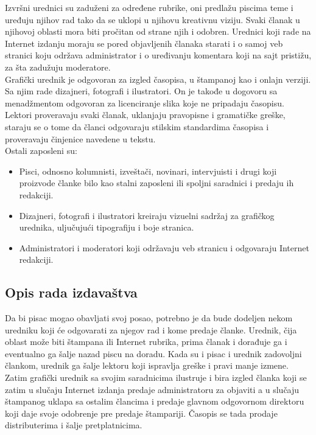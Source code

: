 \documentclass[a4paper,12pt]{extarticle}
\begin{document}
Izvršni urednici su zaduženi za određene rubrike, oni predlažu piscima teme i uređuju njihov  rad tako da se uklopi u njihovu kreativnu viziju. Svaki članak u  njihovoj oblasti mora biti pročitan od strane njih i odobren. Urednici koji rade na Internet izdanju moraju se pored objavljenih članaka starati i o samoj veb stranici koju održava administrator i o uređivanju komentara koji na sajt pristižu, za šta zadužuju moderatore. \\

Grafički urednik je odgovoran za izgled časopisa, u štampanoj kao i onlajn verziji. Sa njim rade dizajneri, fotografi i ilustratori. On je takođe u dogovoru sa menadžmentom odgovoran za licenciranje slika koje ne pripadaju časopisu. \\

Lektori proveravaju svaki članak, uklanjaju pravopisne i gramatičke greške, staraju se o tome da članci odgovaraju stilskim standardima časopisa i proveravaju činjenice navedene u tekstu. \\

Ostali zaposleni su:
\begin{itemize}
\item  Pisci, odnosno kolumnisti, izveštači, novinari, intervjuisti i drugi koji proizvode članke bilo kao stalni zaposleni ili spoljni saradnici i predaju ih redakciji.
\item  Dizajneri, fotografi i ilustratori kreiraju vizuelni sadržaj za grafičkog urednika, uljučujući tipografiju i boje stranica.
\item  Administratori i moderatori koji održavaju veb stranicu i odgovaraju Internet redakciji.
\end{itemize}

\subsection{Opis rada izdavaštva}

Da bi pisac mogao obavljati svoj posao, potrebno je da bude dodeljen nekom uredniku koji će odgovarati za njegov rad i kome predaje članke. Urednik, čija oblast može biti štampana ili Internet rubrika, prima članak i dorađuje ga i eventualno ga šalje nazad piscu na doradu. Kada su i pisac i urednik zadovoljni člankom, urednik ga šalje lektoru koji ispravlja greške i pravi manje izmene. \\

Zatim grafički urednik sa svojim saradnicima ilustruje i bira izgled članka koji se zatim u slučaju Internet izdanja predaje administratoru za objaviti a u slučaju štampanog uklapa sa ostalim člancima i predaje glavnom odgovornom direktoru koji daje svoje odobrenje pre predaje štampariji. Časopis se tada prodaje distributerima i šalje pretplatnicima. \\
\end{document}
